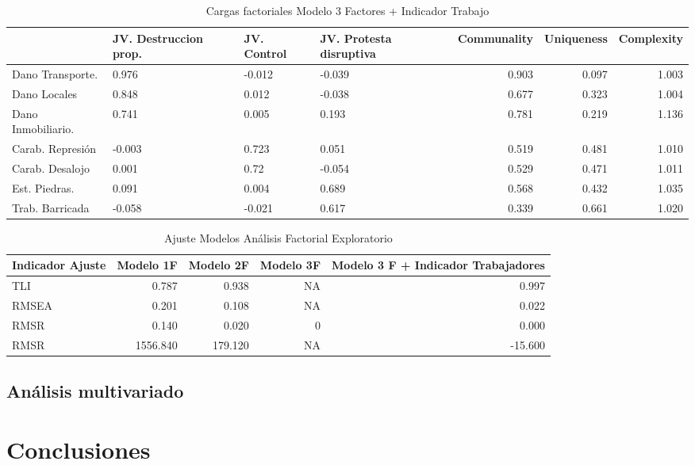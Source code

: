 \documentclass[12pt,twoside]{templates/facsothesis}
\begin{document}
\begin{table}

\caption{\label{tab:f3tt}Cargas factoriales Modelo 3 Factores + Indicador Trabajo}
\centering
\begin{tabular}[t]{l|l|l|l|r|r|r}
\hline
  & JV. Destruccion prop. & JV. Control & JV. Protesta disruptiva & Communality & Uniqueness & Complexity\\
\hline
Dano Transporte. & 0.976 & -0.012 & -0.039 & 0.903 & 0.097 & 1.003\\
\hline
Dano Locales & 0.848 & 0.012 & -0.038 & 0.677 & 0.323 & 1.004\\
\hline
Dano Inmobiliario. & 0.741 & 0.005 & 0.193 & 0.781 & 0.219 & 1.136\\
\hline
Carab. Represión & -0.003 & 0.723 & 0.051 & 0.519 & 0.481 & 1.010\\
\hline
Carab. Desalojo & 0.001 & 0.72 & -0.054 & 0.529 & 0.471 & 1.011\\
\hline
Est. Piedras. & 0.091 & 0.004 & 0.689 & 0.568 & 0.432 & 1.035\\
\hline
Trab. Barricada & -0.058 & -0.021 & 0.617 & 0.339 & 0.661 & 1.020\\
\hline
\end{tabular}
\end{table}

\begin{table}

\caption{\label{tab:indf}Ajuste Modelos Análisis Factorial Exploratorio}
\centering
\begin{tabular}[t]{l|r|r|r|r}
\hline
Indicador Ajuste & Modelo 1F & Modelo 2F & Modelo 3F & Modelo 3 F + Indicador Trabajadores\\
\hline
TLI & 0.787 & 0.938 & NA & 0.997\\
\hline
RMSEA & 0.201 & 0.108 & NA & 0.022\\
\hline
RMSR & 0.140 & 0.020 & 0 & 0.000\\
\hline
RMSR & 1556.840 & 179.120 & NA & -15.600\\
\hline
\end{tabular}
\end{table}

\hypertarget{anuxe1lisis-multivariado}{%
\section{Análisis multivariado}\label{anuxe1lisis-multivariado}}

\hypertarget{conclusiones}{%
\chapter{Conclusiones}\label{conclusiones}}
\end{document}
